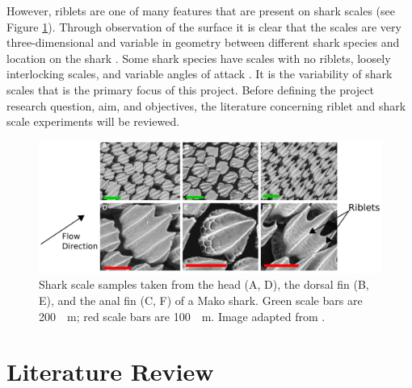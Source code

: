 \documentclass[12pt,oneside,a4paper]{article}
\begin{document}
However, riblets are one of many features that are present on shark scales (see Figure \ref{figure:scalesExample}). Through observation of the surface it is clear that the scales are very three-dimensional and variable in geometry between different shark species and location on the shark \citep{fletcher2014phd}. Some shark species have scales with no riblets, loosely interlocking scales, and variable angles of attack \citep{fletcher2014phd}. It is the variability of shark scales that is the primary focus of this project. Before defining the project research question, aim, and objectives, the literature concerning riblet and shark scale experiments will be reviewed. 
\vspace{2cm}
%
\begin{figure}[!h]
\centering
\includegraphics[width=12cm]{images/Misc/makoScaleExample.png}
\caption{Shark scale samples taken from the head (A, D), the dorsal fin (B, E), and the anal fin (C, F) of a Mako shark. Green scale bars are \SI{200}{\mu m}; red scale bars are \SI{100}{\mu m}. Image adapted from \cite{wen2014}.}
\label{figure:scalesExample}
\end{figure}
%

\newpage
\section{Literature Review}
\label{section:literatureReview}
\end{document}
